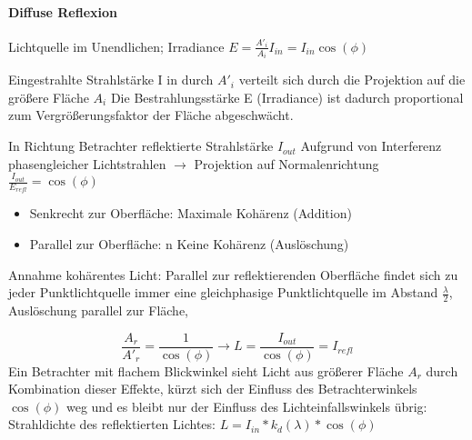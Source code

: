 \documentclass[10pt,landscape]{article}
\begin{document}
\begin{multicols}{3}
\paragraph{Diffuse Reflexion}

Lichtquelle im Unendlichen; Irradiance $E=\frac{A'_i}{A_i}I_{in}=I_{in}\cos(\phi)$

Eingestrahlte Strahlstärke I in durch $A'_i$ verteilt sich durch die Projektion auf die größere Fläche $A_i$ Die Bestrahlungsstärke E (Irradiance) ist dadurch proportional zum Vergrößerungsfaktor der Fläche abgeschwächt.

In Richtung Betrachter reflektierte Strahlstärke $I_{out}$ Aufgrund von Interferenz phasengleicher Lichtstrahlen $\rightarrow$ Projektion auf Normalenrichtung $\frac{I_{out}}{E_{refl}}=\cos(\phi)$
\begin{itemize}
  \item Senkrecht zur Oberfläche: Maximale Kohärenz (Addition)
  \item Parallel zur Oberfläche: n Keine Kohärenz (Auslöschung)
\end{itemize}


Annahme kohärentes Licht: Parallel zur reflektierenden Oberfläche findet sich zu jeder Punktlichtquelle immer eine gleichphasige Punktlichtquelle im Abstand $\frac{\lambda}{2}$, Auslöschung parallel zur Fläche,


$$\frac{A_r}{A'_r}=\frac{1}{\cos(\phi)} \rightarrow L=\frac{I_{out}}{\cos(\phi)}=I_{refl}$$
Ein Betrachter mit flachem Blickwinkel sieht Licht aus größerer Fläche $A_r$ durch Kombination dieser Effekte, kürzt sich der Einfluss des Betrachterwinkels $\cos(\phi)$ weg und es bleibt nur der Einfluss des Lichteinfallswinkels übrig: Strahldichte des reflektierten Lichtes: $L=I_{in}*k_d(\lambda)*\cos(\phi)$


\end{multicols}
\end{document}
